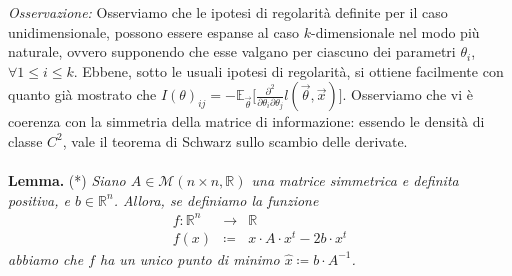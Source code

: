 \textit{Osservazione:} Osserviamo che le ipotesi di regolarità definite per il caso unidimensionale, possono essere espanse al caso $k$-dimensionale nel modo più naturale, ovvero supponendo che esse valgano per ciascuno dei parametri $\theta_i$, $\forall 1\leq i\leq k$. Ebbene, sotto le usuali ipotesi di regolarità, si ottiene facilmente con quanto già mostrato che $I(\theta)_{ij}=-\mathbb{E}_{\vec{\theta}}\big[\frac{\partial^2}{\partial\theta_i\partial\theta_j}l(\vec{\theta},\vec{x})\big]$. Osserviamo che vi è coerenza con la simmetria della matrice di informazione: essendo le densità di classe $C^2$, vale il teorema di Schwarz sullo scambio delle derivate. 
\\
\\
\textbf{Lemma.} (*) \textit{Siano $A\in \mathcal{M}(n\times n, \mathbb{R})$ una matrice simmetrica e definita positiva, e $b\in \mathbb{R}^n$. Allora, se definiamo la funzione 
\begin{eqnarray*}
f : \mathbb{R}^n &\longrightarrow & \mathbb{R} \\
f(x) &\coloneqq & x\cdot A \cdot x^t -2b\cdot x^t
\end{eqnarray*}
abbiamo che $f$ ha un unico punto di minimo $\hat{x}\coloneqq b\cdot A^{-1}$.}



